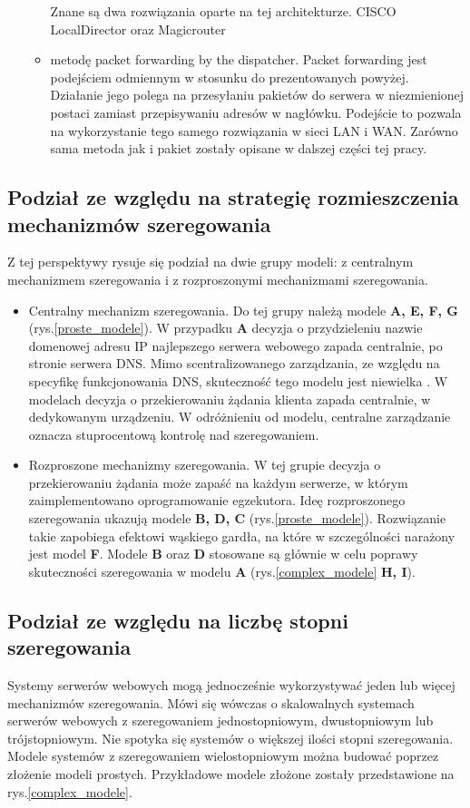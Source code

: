 \begin{itemize}
\begin{itemize}
Znane są dwa rozwiązania oparte na tej architekturze. CISCO LocalDirector  \cite{gliwice13} oraz Magicrouter  \cite{modele1}
\item metodę packet forwarding by the dispatcher.
Packet forwarding jest podejściem odmiennym w stosunku do prezentowanych powyżej. Działanie jego polega na przesyłaniu 
pakietów do serwera w niezmienionej postaci zamiast przepisywaniu adresów w nagłówku. Podejście to pozwala na wykorzystanie 
tego samego rozwiązania w sieci LAN i WAN. Zarówno sama metoda jak i pakiet zostały opisane w dalszej części tej pracy.
\end{itemize}
\end{itemize}

\subsection{Podział ze względu na strategię rozmieszczenia mechanizmów szeregowania}
Z tej perspektywy rysuje się podział na dwie grupy modeli: z centralnym mechanizmem szeregowania i z rozproszonymi 
mechanizmami szeregowania.
\begin{itemize}
\item Centralny mechanizm szeregowania. Do tej grupy należą modele {\bf A, E, F, G} (rys.\ref{proste_modele}). W przypadku {\bf A} decyzja o przydzieleniu 
nazwie domenowej adresu IP najlepszego serwera webowego zapada centralnie, po stronie serwera DNS. Mimo scentralizowanego 
zarządzania, ze względu na specyfikę funkcjonowania DNS, skuteczność tego modelu jest 
niewielka \cite{modele14,ModeleFunkcjonalne}. W modelach  
decyzja o przekierowaniu żądania klienta zapada centralnie, w dedykowanym urządzeniu. W odróżnieniu od modelu, centralne 
zarządzanie oznacza stuprocentową kontrolę nad szeregowaniem.
\item Rozproszone mechanizmy szeregowania. W tej grupie decyzja o przekierowaniu żądania może zapaść na każdym serwerze, w 
którym zaimplementowano oprogramowanie egzekutora. Ideę rozproszonego szeregowania ukazują modele {\bf B, D, C} (rys.\ref{proste_modele}). Rozwiązanie takie zapobiega 
efektowi wąskiego gardła, na które w szczególności narażony jest model {\bf F}. Modele {\bf B} oraz {\bf D}
stosowane są głównie w celu poprawy skuteczności szeregowania w modelu {\bf A} (rys.\ref{complex_modele} {\bf H, I}).
\end{itemize}

\subsection{Podział ze względu na liczbę stopni szeregowania}
Systemy serwerów webowych mogą jednocześnie wykorzystywać jeden lub więcej mechanizmów szeregowania. Mówi się wówczas o 
skalowalnych systemach serwerów webowych z szeregowaniem jednostopniowym, dwustopniowym lub trójstopniowym. Nie spotyka się 
systemów o większej ilości stopni szeregowania. Modele systemów z szeregowaniem wielostopniowym można budować poprzez złożenie 
modeli prostych. Przykładowe modele złożone zostały przedstawione na rys.\ref{complex_modele}.

